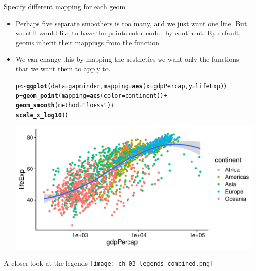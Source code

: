 \documentclass[10pt]{beamer}\usepackage[]{graphicx}\usepackage[]{color}
\makeatletter
\def\maxwidth{ %
  \ifdim\Gin@nat@width>\linewidth
    \linewidth
  \else
    \Gin@nat@width
  \fi
}
\newcommand{\hlstr}[1]{\textcolor[rgb]{0.192,0.494,0.8}{#1}}%
\newcommand{\hlopt}[1]{\textcolor[rgb]{0,0,0}{#1}}%
\newcommand{\hlstd}[1]{\textcolor[rgb]{0.345,0.345,0.345}{#1}}%
\newcommand{\hlkwb}[1]{\textcolor[rgb]{0.69,0.353,0.396}{#1}}%
\newcommand{\hlkwc}[1]{\textcolor[rgb]{0.333,0.667,0.333}{#1}}%
\newcommand{\hlkwd}[1]{\textcolor[rgb]{0.737,0.353,0.396}{\textbf{#1}}}%
\newenvironment{kframe}{%
 \def\at@end@of@kframe{}%
 \ifinner\ifhmode%
  \def\at@end@of@kframe{\end{minipage}}%
  \begin{minipage}{\columnwidth}%
 \fi\fi%
 \def\FrameCommand##1{\hskip\@totalleftmargin \hskip-\fboxsep
 \colorbox{shadecolor}{##1}\hskip-\fboxsep
     \hskip-\linewidth \hskip-\@totalleftmargin \hskip\columnwidth}%
 \MakeFramed {\advance\hsize-\width
   \@totalleftmargin\z@ \linewidth\hsize
   \@setminipage}}%
 {\par\unskip\endMakeFramed%
 \at@end@of@kframe}
\newenvironment{knitrout}{}{} %
\makeatother
\begin{document}
\begin{frame}[fragile]{Specify different mapping for each geom}
	\small
	\begin{itemize}
		\item Perhaps five separate smoothers is too many, and we just want one line. But we still would like to have the points color-coded by continent. By default, geoms inherit their mappings from the  function \pause
		\item We can change this by mapping the aesthetics we want only the  functions that we want them to apply to.\pause
\begin{knitrout}\tiny
{}\color{fgcolor}\begin{kframe}
\begin{alltt}
\hlstd{p} \hlkwb{<-} \hlkwd{ggplot}\hlstd{(}\hlkwc{data} \hlstd{= gapminder,} \hlkwc{mapping} \hlstd{=} \hlkwd{aes}\hlstd{(}\hlkwc{x} \hlstd{= gdpPercap,} \hlkwc{y} \hlstd{= lifeExp))}
\hlstd{p} \hlopt{+} \hlkwd{geom_point}\hlstd{(}\hlkwc{mapping} \hlstd{=} \hlkwd{aes}\hlstd{(}\hlkwc{color} \hlstd{= continent))} \hlopt{+}
        \hlkwd{geom_smooth}\hlstd{(}\hlkwc{method} \hlstd{=} \hlstr{"loess"}\hlstd{)} \hlopt{+}
        \hlkwd{scale_x_log10}\hlstd{()}
\end{alltt}
\end{kframe}

{\centering \includegraphics[width=\maxwidth]{figure/unnamed-chunk-18-1} 

}


\end{knitrout}
\end{itemize}
	
\end{frame}


\begin{frame}{A closer look at the legends}
	\centering
	\texttt{[image: ch-03-legends-combined.png]}
\end{frame}
\end{document}

